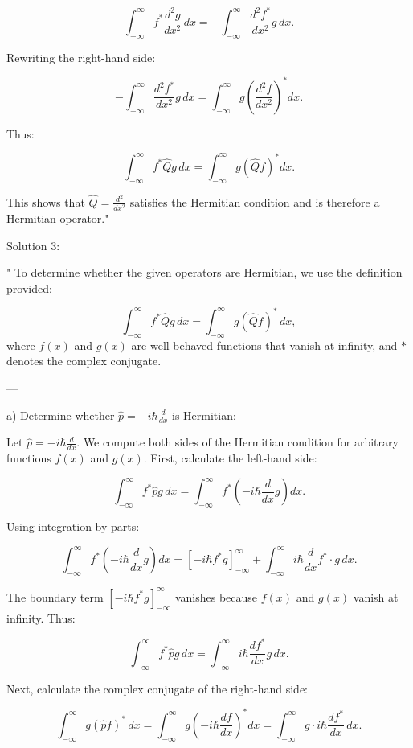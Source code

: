\[
\int_{-\infty}^\infty f^* \frac{d^2 g}{dx^2} \, dx = - \int_{-\infty}^\infty \frac{d^2 f^*}{dx^2} g \, dx.
\]

Rewriting the right-hand side:

\[
- \int_{-\infty}^\infty \frac{d^2 f^*}{dx^2} g \, dx = \int_{-\infty}^\infty g \left(\frac{d^2 f}{dx^2}\right)^* dx.
\]

Thus:

\[
\int_{-\infty}^\infty f^* \hat{Q} g \, dx = \int_{-\infty}^\infty g (\hat{Q} f)^* dx.
\]

This shows that $\hat{Q} = \frac{d^2}{dx^2}$ satisfies the Hermitian condition and is therefore a Hermitian operator."

Solution 3:

"
To determine whether the given operators are Hermitian, we use the definition provided:

\[
\int_{-\infty}^\infty f^* \hat{Q} g \, dx = \int_{-\infty}^\infty g (\hat{Q} f)^* \, dx,
\]
where \( f(x) \) and \( g(x) \) are well-behaved functions that vanish at infinity, and \( * \) denotes the complex conjugate. 

---

a) Determine whether \( \hat{p} = -i\hbar \frac{d}{dx} \) is Hermitian:

Let \( \hat{p} = -i\hbar \frac{d}{dx} \). We compute both sides of the Hermitian condition for arbitrary functions \( f(x) \) and \( g(x) \). First, calculate the left-hand side:

\[
\int_{-\infty}^\infty f^* \hat{p} g \, dx = \int_{-\infty}^\infty f^* \left(-i\hbar \frac{d}{dx} g\right) dx.
\]

Using integration by parts:

\[
\int_{-\infty}^\infty f^* \left(-i\hbar \frac{d}{dx} g\right) dx = \left[ -i\hbar f^* g \right]_{-\infty}^\infty + \int_{-\infty}^\infty i\hbar \frac{d}{dx} f^* \cdot g \, dx.
\]

The boundary term \( \left[ -i\hbar f^* g \right]_{-\infty}^\infty \) vanishes because \( f(x) \) and \( g(x) \) vanish at infinity. Thus:

\[
\int_{-\infty}^\infty f^* \hat{p} g \, dx = \int_{-\infty}^\infty i\hbar \frac{d f^*}{dx} g \, dx.
\]

Next, calculate the complex conjugate of the right-hand side:

\[
\int_{-\infty}^\infty g (\hat{p} f)^* \, dx = \int_{-\infty}^\infty g \left(-i\hbar \frac{df}{dx}\right)^* dx = \int_{-\infty}^\infty g \cdot i\hbar \frac{d f^*}{dx} \, dx.
\]

